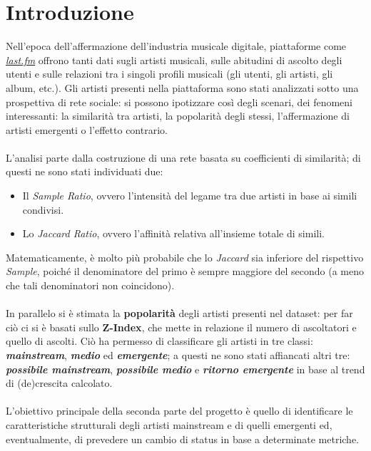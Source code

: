 \documentclass[sigchi]{acmart}
\begin{document}
%


%
\maketitle

\section{Introduzione}
Nell'epoca dell'affermazione dell'industria musicale digitale, piattaforme come {\itshape \href{https://www.last.fm/home}{last.fm}} offrono tanti dati sugli artisti musicali, sulle abitudini di ascolto degli utenti e sulle relazioni tra i singoli profili musicali (gli utenti, gli artisti, gli album, etc.). Gli artisti presenti nella piattaforma sono stati analizzati sotto una prospettiva di rete sociale: si possono ipotizzare così degli scenari, dei fenomeni interessanti: la similarità tra artisti, la popolarità degli stessi, l'affermazione di artisti emergenti o l'effetto contrario. \\ \\ L'analisi parte dalla costruzione di una rete basata su coefficienti di similarità; di questi ne sono stati individuati due:

\begin{itemize}
\item Il {\itshape Sample Ratio}, ovvero l’intensità del legame tra due artisti in base ai simili condivisi.
\item Lo {\itshape Jaccard Ratio}, ovvero l’affinità relativa all’insieme totale di simili.
\end{itemize}
Matematicamente, è molto più probabile che lo {\itshape Jaccard} sia inferiore del rispettivo {\itshape Sample}, poiché il denominatore del primo è sempre maggiore del secondo (a meno che tali denominatori non coincidono). \\ \\ In parallelo si è stimata la {\bfseries popolarità} degli artisti presenti nel dataset: per far ciò ci si è basati sullo {\bfseries Z-Index}, che mette in relazione il numero di ascoltatori e quello di ascolti. Ciò ha permesso di classificare gli artisti in tre classi: {\bfseries \itshape mainstream}, {\bfseries \itshape medio} ed {\bfseries \itshape emergente}; a questi ne sono stati affiancati altri tre: {\bfseries \itshape possibile mainstream}, {\bfseries \itshape possibile medio} e {\bfseries \itshape ritorno emergente} in base al trend di (de)crescita calcolato. \\ \\ L'obiettivo principale della seconda parte del progetto è quello di identificare le caratteristiche strutturali degli artisti mainstream e di quelli emergenti ed, eventualmente, di prevedere un cambio di status in base a determinate metriche.
\end{document}
